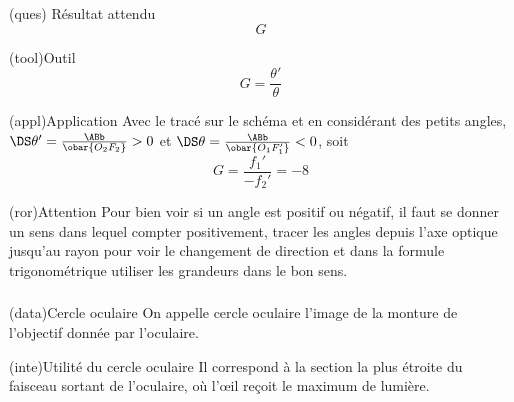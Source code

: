 \documentclass[../../main/main.tex]{subfiles}
\begin{document}
{	\subsubsection{}
	\begin{tcbraster}[raster columns=6, raster equal height=rows]
		\begin{tcolorbox}[blankest, raster multicolumn=1, space to=\myspace]
			\begin{tcbraster}[raster columns=1]
				\begin{tcb}[add to natural height=\myspace, valign=top](ques)
					{Résultat attendu}
					$$G$$
				\end{tcb}
				\begin{tcb}(tool){Outil}
					\[ G = \frac{\theta'}{\theta}\]
				\end{tcb}
			\end{tcbraster}
		\end{tcolorbox}
		\begin{tcb}[raster multicolumn=2](appl){Application}
			Avec le tracé sur le schéma et en considérant des petits angles,
			$\DS \theta' = \frac{\ABb}{\obar{O_2F_2}} > 0$ et $\DS \theta =
				\frac{\ABb}{\obar{O_1F_1'}} < 0$, soit \[ G = \frac{f_1'}{-f_2'} = -8\]
		\end{tcb}
		\begin{tcb}[raster multicolumn=3](ror){Attention}
			Pour bien voir si un angle est positif ou négatif, il faut se donner un
			sens dans lequel compter positivement, tracer les angles depuis l'axe
			optique jusqu'au rayon pour voir le changement de direction et dans la
			formule trigonométrique utiliser les grandeurs dans le bon sens.
		\end{tcb}
	\end{tcbraster}

	\subsubsection{}\label{sssec:k_cercleo}
	\begin{tcbraster}[raster columns=2, raster equal height=rows]
		\begin{tcb}(data){Cercle oculaire}
			On appelle cercle oculaire l'image de la monture de l'objectif donnée par
			l'oculaire.
		\end{tcb}
		\begin{tcb}(inte){Utilité du cercle oculaire}
			Il correspond à la section la plus étroite du faisceau sortant de
			l'oculaire, où l'œil reçoit le maximum de lumière.
		\end{tcb}
	\end{tcbraster}

}
\end{document}
